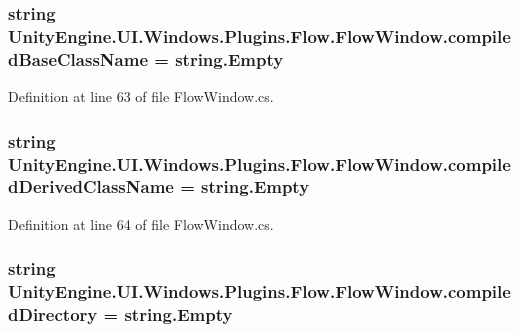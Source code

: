 \subsubsection[{compiled\+Base\+Class\+Name}]{\setlength{\rightskip}{0pt plus 5cm}string Unity\+Engine.\+U\+I.\+Windows.\+Plugins.\+Flow.\+Flow\+Window.\+compiled\+Base\+Class\+Name = string.\+Empty}\label{class_unity_engine_1_1_u_i_1_1_windows_1_1_plugins_1_1_flow_1_1_flow_window_af194ba46d6c3b833bc2f2352ce3c6ff6}


Definition at line 63 of file Flow\+Window.\+cs.

\hypertarget{class_unity_engine_1_1_u_i_1_1_windows_1_1_plugins_1_1_flow_1_1_flow_window_ab7971f5e2c03511723ac6fc9c2763aa8}{}
\subsubsection[{compiled\+Derived\+Class\+Name}]{\setlength{\rightskip}{0pt plus 5cm}string Unity\+Engine.\+U\+I.\+Windows.\+Plugins.\+Flow.\+Flow\+Window.\+compiled\+Derived\+Class\+Name = string.\+Empty}\label{class_unity_engine_1_1_u_i_1_1_windows_1_1_plugins_1_1_flow_1_1_flow_window_ab7971f5e2c03511723ac6fc9c2763aa8}


Definition at line 64 of file Flow\+Window.\+cs.

\hypertarget{class_unity_engine_1_1_u_i_1_1_windows_1_1_plugins_1_1_flow_1_1_flow_window_a5283ae0afbb52869b9fa12acccd77830}{}
\subsubsection[{compiled\+Directory}]{\setlength{\rightskip}{0pt plus 5cm}string Unity\+Engine.\+U\+I.\+Windows.\+Plugins.\+Flow.\+Flow\+Window.\+compiled\+Directory = string.\+Empty}\label{class_unity_engine_1_1_u_i_1_1_windows_1_1_plugins_1_1_flow_1_1_flow_window_a5283ae0afbb52869b9fa12acccd77830}


